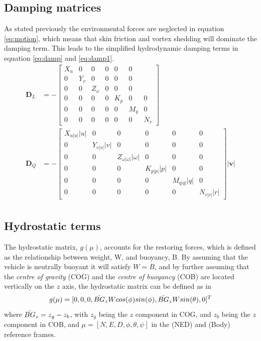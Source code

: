 \subsection{Damping matrices}
As stated previously the environmental forces are neglected in equation \ref{eq:motion}, which means that skin friction and vortex shedding will dominate the damping term. This leads to the simplified hydrodynamic damping terms in equation \ref{eq:damp} and \ref{eq:damp1}.
\begin{align}
    \mathbf{D}_{L} & = -\begin{bmatrix}
                X_{u} & 0 & 0 & 0 & 0 & 0\\
                0 & Y_{v} & 0 & 0 & 0 & 0 \\
                0 & 0 & Z_{\omega} & 0 & 0 & 0 \\
                0 & 0 & 0 & 0 & K_{p} & 0 & 0 \\
                0 & 0 & 0 & 0 & 0 & M_{q} & 0 \\
                0 & 0 & 0 & 0 & 0 & 0 & N_{r} 
                \label{eq:damp}
                \end{bmatrix} \\
    \mathbf{D}_{Q} & = -\begin{bmatrix}
                X_{u|u|}|u| & 0 & 0 & 0 & 0 & 0\\
                0 & Y_{v|v|}|v| & 0 & 0 & 0 & 0\\
                0 & 0 & Z_{\omega|\omega|}|\omega| & 0 & 0 & 0\\
                0 & 0 & 0 & K_{p|p|}|p| & 0 & 0 \\
                0 & 0 & 0 & 0 & M_{q|q|}|q| & 0 \\
                0 & 0 & 0 & 0 & 0 & N_{r|r|}|r|
                \label{eq:damp1}
                \end{bmatrix}|\mathbf{v}| \\
\end{align}
\subsection{Hydrostatic terms}
The hydrostatic matrix, $g(\mu)$, accounts for the restoring forces, which is defined as the relationship between weight, W, and buoyancy, B. By assuming that the vehicle is neutrally buoyant it will satisfy $W = B$, and by further assuming that the \textit{centre of gravity} (COG) and the \textit{centre of buoyancy} (COB) are located vertically on the $z$ axis, the hydrostatic matrix can be defined as in \cite{Fossen}
\begin{equation}
    g(\mu) = [0, 0, 0, \Bar{BG}_{z} W cos(\phi)sin(\phi), \Bar{BG}_{z} W sin(\theta), 0]^{T}
\end{equation}
where $\Bar{BG}_{z}=z_{g}-z_{b}$, with $z_{g}$ being the $z$ component in COG, and $z_{b}$ being the $z$ component in COB, and $\mu = [N, E, D, \phi, \theta, \psi]$ in the (NED) and (Body) reference frames. 
